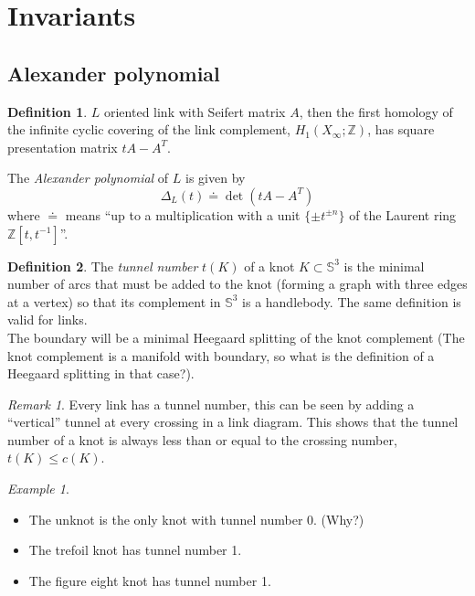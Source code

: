 \documentclass[nobib]{tufte-book} %
\theoremstyle{definition}
\newtheorem{definition}{Definition}
\theoremstyle{remark}
\newtheorem{remark}{Remark}
\newtheorem{example}{Example}
\newcommand{\sphere}[1]{\mathbb{S}^{#1}}
\newcommand{\Z}{\mathbb{Z}}
\begin{document}
\section{Invariants}

\subsection{Alexander polynomial}

\begin{definition}
	$L$ oriented link with Seifert matrix $A$, then the first homology of
	the infinite cyclic covering of the link complement, $H_1(X_{\infty} ; \Z)$,
	has square presentation matrix $t A - A^{T}$.
	
	The \textit{Alexander polynomial} of $L$ is given by
	\begin{equation*}
		\Delta_{L}(t) \doteq \det(t A - A^{T})
	\end{equation*}
	where $\doteq$ means ``up to a multiplication with a unit $\{ \pm t^{\pm n} \}$
	of the Laurent ring $\Z[t, t^{-1}]$''.
	\marginnote{
		\begin{remark}
			$\Z[t^{\pm 1}]$ is \textbf{not} a PID.
		\end{remark}
	}
\end{definition}




\begin{definition}
	The \textit{tunnel number} $t(K)$ of a knot $K \subset \sphere{3}$ is the minimal number of arcs
	that must be added to the knot (forming a graph with three edges at a vertex) so that
	its complement in $\sphere{3}$ is a handlebody. The same definition is
	valid for links. \\
	The boundary will be a minimal Heegaard splitting of the knot complement
	(The knot complement is a manifold with boundary, so what is the definition
	of a Heegaard splitting in that case?).
\end{definition}

\begin{remark}
	Every link has a tunnel number, this can be seen by adding a ``vertical''
	tunnel at every crossing in a link diagram.
	This shows that the tunnel number of a knot is always less than or equal
	to the crossing number, $t(K) \le c(K)$.
\end{remark}

\begin{example}
	\begin{itemize}
		\item The unknot is the only knot with tunnel number 0. (Why?)
		\item The trefoil knot has tunnel number 1.
		\item The figure eight knot has tunnel number 1.
	\end{itemize}
\end{example}
\end{document}
